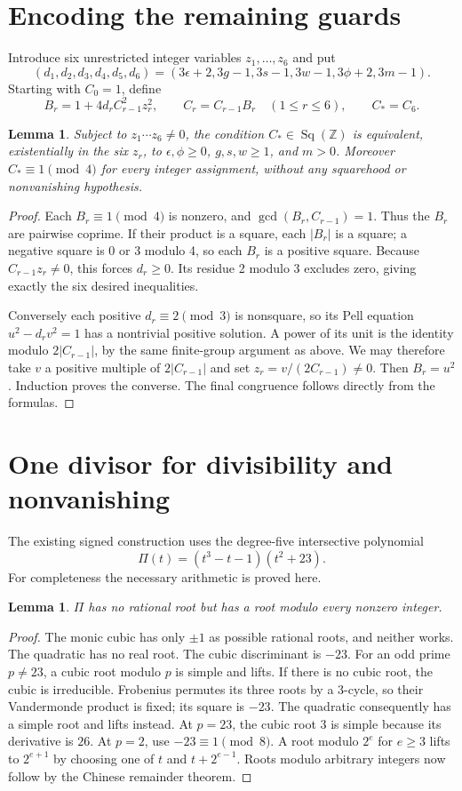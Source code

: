 \documentclass[11pt]{article}
\newtheorem{lemma}[theorem]{Lemma}
\theoremstyle{remark}\newtheorem{remark}[theorem]{Remark}
\newcommand{\Z}{\mathbb Z}\newcommand{\N}{\mathbb N}
\newcommand{\Sq}{\operatorname{Sq}(\Z)}
\begin{document}
\section{Encoding the remaining guards}\label{sec:guards}
Introduce six unrestricted integer variables $z_1,\ldots,z_6$ and put
\[
 (d_1,d_2,d_3,d_4,d_5,d_6)=
 (3\epsilon+2,3g-1,3s-1,3w-1,3\phi+2,3m-1).
\]
Starting with $C_0=1$, define
\[
 B_r=1+4d_rC_{r-1}^2z_r^2,\qquad
 C_r=C_{r-1}B_r\quad(1\le r\le6),\qquad C_*=C_6.
\]
\begin{lemma}\label{lem:stack}
Subject to $z_1\cdots z_6\ne0$, the condition $C_*\in\Sq$ is equivalent,
existentially in the six $z_r$, to
$\epsilon,\phi\ge0$, $g,s,w\ge1$, and $m>0$.
Moreover $C_*\equiv1\pmod4$ for every integer assignment, without any
squarehood or nonvanishing hypothesis.
\end{lemma}
\begin{proof}
Each $B_r\equiv1\pmod4$ is nonzero, and
$\gcd(B_r,C_{r-1})=1$. Thus the $B_r$ are pairwise coprime.
If their product is a square, each $|B_r|$ is a square; a negative square
is 0 or 3 modulo 4, so each $B_r$ is a positive square. Because
$C_{r-1}z_r\ne0$, this forces $d_r\ge0$. Its residue 2 modulo 3 excludes
zero, giving exactly the six desired inequalities.

Conversely each positive $d_r\equiv2\pmod3$ is nonsquare, so its Pell
equation $u^2-d_rv^2=1$ has a nontrivial positive solution. A power of its
unit is the identity modulo $2|C_{r-1}|$, by the same finite-group argument
as above. We may therefore take $v$ a positive multiple of
$2|C_{r-1}|$ and set $z_r=v/(2C_{r-1})\ne0$. Then $B_r=u^2$.
Induction proves the converse. The final congruence follows directly from
the formulas.
\end{proof}

\section{One divisor for divisibility and nonvanishing}\label{sec:merger}
The existing signed construction uses the degree-five intersective polynomial
\[
 \Pi(t)=(t^3-t-1)(t^2+23).
\]
For completeness the necessary arithmetic is proved here.
\begin{lemma}\label{lem:intersective}
$\Pi$ has no rational root but has a root modulo every nonzero integer.
\end{lemma}
\begin{proof}
The monic cubic has only $\pm1$ as possible rational roots, and neither
works. The quadratic has no real root. The cubic discriminant is $-23$.
For an odd prime $p\ne23$, a cubic root modulo $p$ is simple and lifts.
If there is no cubic root, the cubic is irreducible. Frobenius permutes its
three roots by a 3-cycle, so their Vandermonde product is fixed; its square
is $-23$. The quadratic consequently has a simple root and lifts instead.
At $p=23$, the cubic root $3$ is simple because its derivative is $26$.
At $p=2$, use $-23\equiv1\pmod8$. A root modulo $2^e$ for $e\ge3$
lifts to $2^{e+1}$ by choosing one of $t$ and $t+2^{e-1}$.
Roots modulo arbitrary integers now follow by the Chinese remainder theorem.
\end{proof}
\end{document}
